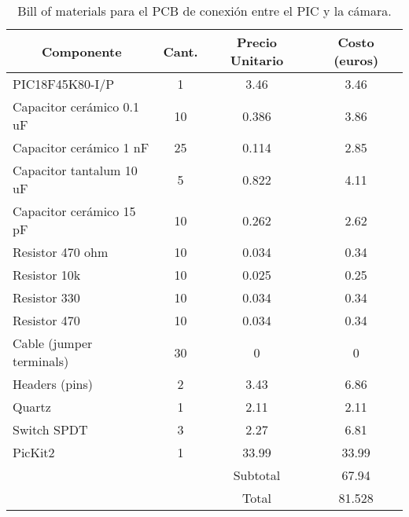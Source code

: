 \begin{table}
\begin{center}
\begin{tabular}{| l | c | c | c |}
\hline
\multicolumn{1}{|c|}{Componente}	 & 	\multicolumn{1}{c|}{Cant.}	 & 	\multicolumn{1}{c|}{Precio Unitario} & 	\multicolumn{1}{c|}{Costo (euros)}\\ \hline
PIC18F45K80-I/P	 & 	1	 & 	3.46	 & 	3.46\\ \hline
Capacitor cerámico 0.1 uF	 & 	10	 & 	0.386	 & 	3.86\\ \hline
Capacitor cerámico 1 nF	 & 	25	 & 	0.114	 & 	2.85\\ \hline
Capacitor tantalum 10 uF	 & 	5	 & 	0.822	 & 	4.11\\ \hline
Capacitor cerámico 15 pF	 & 	10	 & 	0.262	 & 	2.62\\ \hline
Resistor 470 ohm	 & 	10	 & 	0.034	 & 	0.34\\ \hline
Resistor 10k	 & 	10	 & 	0.025	 & 	0.25\\ \hline
Resistor 330	 & 	10	 & 	0.034	 & 	0.34\\ \hline
Resistor 470	 & 	10	 & 	0.034	 & 	0.34\\ \hline
Cable (jumper terminals)	 & 	30	 & 	0	 & 	0\\ \hline
Headers (pins)	 & 	2	 & 	3.43	 & 	6.86\\ \hline
Quartz	 & 	1	 & 	2.11	 & 	2.11\\ \hline
Switch SPDT	 & 	3	 & 	2.27	 & 	6.81\\ \hline
PicKit2	 & 	1	 & 	33.99	 & 	33.99\\ \hline
\multicolumn{2}{c|}{}	 & 	Subtotal	 & 	67.94\\ \cline{3-4}
\multicolumn{2}{c|}{}	& 	Total	 & 	81.528\\ \cline{3-4}
  \end{tabular}
\caption{Bill of materials para el PCB de conexión entre el PIC y la cámara.}
\label{tab_bompic}
\end{center}
\end{table}
